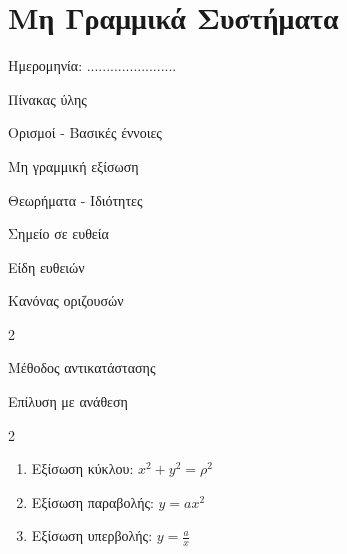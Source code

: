 \documentclass[twoside,nofonts,internet,math,spyros]{frontisthrio}
\newcommand{\myitem}{\stepcounter{enumi}\item[\raisebox{0.5mm}{\faEdit}\ \Large$\square$]}
\begin{document}
\section{Μη Γραμμικά Συστήματα}
\begin{flushright}
\faCalendar* Ημερομηνία: .......................
\end{flushright}
\begin{mybox}[mysubtitle]{Πίνακας ύλης}
\begin{tcbraster}[raster columns=2,raster equal height]
\begin{myleftbox}{Ορισμοί - Βασικές έννοιες\ \ \faBook}
\begin{arithmisi}[itemsep=0mm]
\item Μη γραμμική εξίσωση
\end{arithmisi}
\end{myleftbox}
\begin{myrightbox}{Θεωρήματα - Ιδιότητες\ \ \faTools}
\begin{arithmisi}[itemsep=0mm]
\item Σημείο σε ευθεία
\item Είδη ευθειών
\item Κανόνας οριζουσών
\end{arithmisi}
\end{myrightbox}
\end{tcbraster}
\begin{multicols}{2}
\begin{todolist}[itemsep=0mm]
\myitem Μέθοδος αντικατάστασης
\item Επίλυση με ανάθεση
\end{todolist}
\end{multicols}
\begin{multicols}{2}
\begin{enumerate}[itemsep=0mm]
\item Εξίσωση κύκλου: $ x^2+y^2=\rho^2 $
\item Εξίσωση παραβολής: $ y=ax^2 $
\item Εξίσωση υπερβολής: $ y=\frac{a}{x} $
\end{enumerate}
\end{multicols}
\end{mybox}

\newpage
\end{document}
